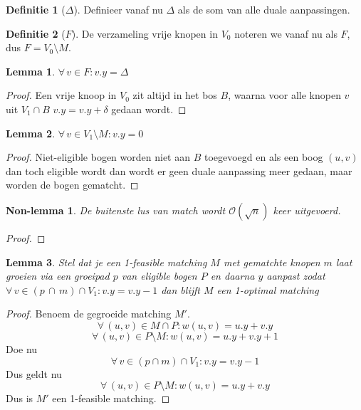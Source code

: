 \documentclass[conference]{IEEEtran}
\newtheorem{lemma}{Lemma}[section]
\newtheorem{nonLemma}{Non-lemma}[section]
\theoremstyle{definition}
\newtheorem{definition}{Definitie}[section]
\theoremstyle{remark}
\let \oldforall \forall
\renewcommand{\forall}{\oldforall\,}
\begin{document}
\begin{definition}[$\Delta$]
    Definieer vanaf nu $\Delta$ als de som van alle duale aanpassingen.
\end{definition}

\begin{definition}[$F$]
    De verzameling vrije knopen in $V_0$ noteren we vanaf nu als $F$, dus $F = V_0 \setminus M$.
\end{definition}

\begin{lemma}
    $\forall v \in F: v.y = \Delta$
\end{lemma}
\begin{proof}
    Een vrije knoop in $V_0$ zit altijd in het bos $B$, waarna voor alle knopen $v$ uit $V_1 \cap B$ $v.y = v.y + \delta$ gedaan wordt.
\end{proof}

\begin{lemma}
    $\forall v \in V_1 \setminus M: v.y = 0$
\end{lemma}
\begin{proof}
    Niet-eligible bogen worden niet aan $B$ toegevoegd en als een boog $(u, v)$ dan toch eligible wordt dan wordt er geen duale aanpassing meer gedaan, maar worden de bogen gematcht.
\end{proof}

\begin{nonLemma}
    De buitenste lus van \textit{match} wordt $\mathcal{O}(\sqrt{n})$ keer uitgevoerd.
\end{nonLemma}
\begin{proof}
    
\end{proof}

\begin{lemma}
    Stel dat je een 1-feasible matching $M$ met gematchte knopen $m$ laat groeien via een groeipad $p$ van eligible bogen $P$ en daarna $y$ aanpast zodat $\forall v \in (p\, \cap\, m) \cap V_1: v.y = v.y - 1$ dan blijft $M$ een 1-optimal matching
\end{lemma}
\begin{proof}
    Benoem de gegroeide matching $M'$.
    $$\forall (u, v) \in M \cap P: w(u, v) = u.y + v.y$$
    $$\forall (u, v) \in P \setminus M: w(u, v) = u.y + v.y + 1$$
    Doe nu
    $$\forall v \in (p \cap m) \cap V_1: v.y = v.y - 1$$
    Dus geldt nu
    $$\forall (u, v) \in P\setminus M: w(u, v) = u.y + v.y$$
    Dus is $M'$ een 1-feasible matching.
\end{proof}
\end{document}
